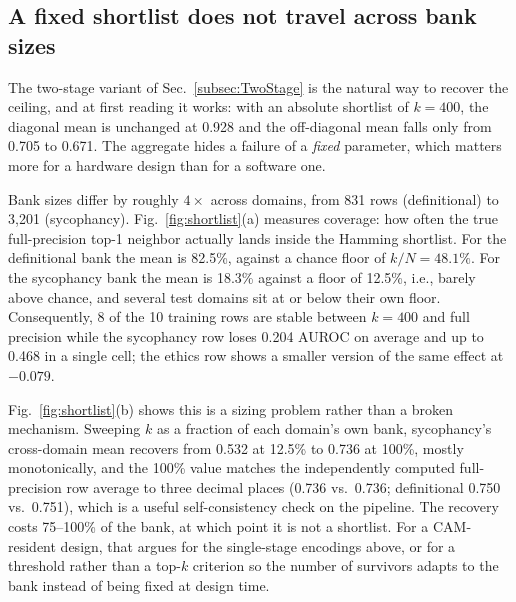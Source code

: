 \documentclass[conference]{IEEEtran}
\newcommand{\cam}{{CAM}\xspace}
\newcommand{\auroc}{{AUROC}\xspace}
\begin{document}

\subsection{A fixed shortlist does not travel across bank sizes}
\label{subsec:Shortlist}
The two-stage variant of Sec.~\ref{subsec:TwoStage} is the natural way
to recover the ceiling, and at first reading it works: with an absolute
shortlist of $k=400$, the diagonal mean is unchanged at 0.928 and the
off-diagonal mean falls only from 0.705 to 0.671. The aggregate hides a
failure of a \emph{fixed} parameter, which matters more for a hardware
design than for a software one.

Bank sizes differ by roughly $4\times$ across domains, from 831 rows
(definitional) to 3{,}201 (sycophancy). Fig.~\ref{fig:shortlist}(a)
measures coverage: how often the true full-precision top-1 neighbor
actually lands inside the Hamming shortlist. For the definitional bank
the mean is 82.5\%, against a chance floor of $k/N = 48.1\%$. For the
sycophancy bank the mean is 18.3\% against a floor of 12.5\%, i.e.,
barely above chance, and several test domains sit at or below their own
floor. Consequently, 8 of the 10 training rows are stable between $k=400$
and full precision while the sycophancy row loses 0.204 \auroc on
average and up to 0.468 in a single cell; the ethics row shows a smaller
version of the same effect at $-0.079$.

Fig.~\ref{fig:shortlist}(b) shows this is a sizing problem rather than a
broken mechanism. Sweeping $k$ as a fraction of each domain's own bank,
sycophancy's cross-domain mean recovers from 0.532 at 12.5\% to 0.736 at
100\%, mostly monotonically, and the 100\% value matches the
independently computed full-precision row average to three decimal places
(0.736 vs.\ 0.736; definitional 0.750 vs.\ 0.751), which is a useful
self-consistency check on the pipeline. The recovery costs 75--100\% of
the bank, at which point it is not a shortlist. For a \cam-resident
design, that argues for the single-stage encodings above, or for a
threshold rather than a top-$k$ criterion so the number of survivors
adapts to the bank instead of being fixed at design time.
\end{document}
